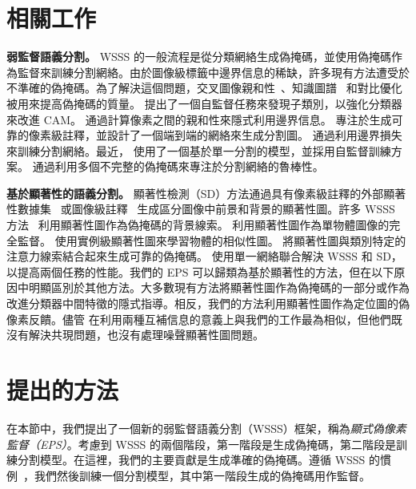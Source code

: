 \documentclass[final]{cvpr}
\begin{document}
\section{相關工作}

\noindent\textbf{弱監督語義分割。}
WSSS 的一般流程是從分類網絡生成偽掩碼，並使用偽掩碼作為監督來訓練分割網絡。由於圖像級標籤中邊界信息的稀缺，許多現有方法遭受於不準確的偽掩碼。為了解決這個問題，交叉圖像親和性~\cite{fan2020cian}、知識圖譜~\cite{liu2020leveraging} 和對比優化~\cite{sun2020mining, zhang2020splitting} 被用來提高偽掩碼的質量。\cite{chang2020weakly} 提出了一個自監督任務來發現子類別，以強化分類器來改進 CAM。\cite{ahn2019weakly, ahn2018learning} 通過計算像素之間的親和性來隱式利用邊界信息。\cite{zhang2020reliability} 專注於生成可靠的像素級註釋，並設計了一個端到端的網絡來生成分割圖。\cite{huang2018weakly, kolesnikov2016seed} 通過利用邊界損失來訓練分割網絡。最近，\cite{araslanov2020single} 使用了一個基於單一分割的模型，並採用自監督訓練方案。\cite{fan2020employing} 通過利用多個不完整的偽掩碼來專注於分割網絡的魯棒性。



\vspace{1mm}
\noindent\textbf{基於顯著性的語義分割。}
顯著性檢測（SD）方法通過具有像素級註釋的外部顯著性數據集~\cite{hou2017deeply, xiao2018deep, zhao2019pyramid} 或圖像級註釋~\cite{wang2017learning} 生成區分圖像中前景和背景的顯著性圖。許多 WSSS 方法~\cite{fan2020cian, huang2018weakly, lee2019ficklenet, li2018tell, wei2017object, wei2018revisiting} 利用顯著性圖作為偽掩碼的背景線索。\cite{wei2016stc} 利用顯著性圖作為單物體圖像的完全監督。\cite{fan2018associating} 使用實例級顯著性圖來學習物體的相似性圖。\cite{chaudhry_dcsp_2017, wang2018weakly, yao2020saliency} 將顯著性圖與類別特定的注意力線索結合起來生成可靠的偽掩碼。\cite{zeng2019joint} 使用單一網絡聯合解決 WSSS 和 SD，以提高兩個任務的性能。我們的 EPS 可以歸類為基於顯著性的方法，但在以下原因中明顯區別於其他方法。大多數現有方法將顯著性圖作為偽掩碼的一部分或作為改進分類器中間特徵的隱式指導。相反，我們的方法利用顯著性圖作為定位圖的偽像素反饋。儘管 \cite{zeng2019joint} 在利用兩種互補信息的意義上與我們的工作最為相似，但他們既沒有解決共現問題，也沒有處理噪聲顯著性圖問題。

\section{提出的方法}

在本節中，我們提出了一個新的弱監督語義分割（WSSS）框架，稱為\emph{顯式偽像素監督（EPS）}。考慮到 WSSS 的兩個階段，第一階段是生成偽掩碼，第二階段是訓練分割模型。在這裡，我們的主要貢獻是生成準確的偽掩碼。遵循 WSSS 的慣例~\cite{fan2020learning,jiang2019integral,lee2019ficklenet,li2018tell,wang2020self,wei2017object}，我們然後訓練一個分割模型，其中第一階段生成的偽掩碼用作監督。
\end{document}
